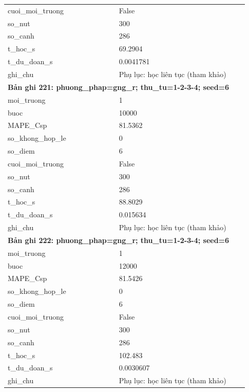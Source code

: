 \begin{longtable}{p{0.43\linewidth}p{0.50\linewidth}}
cuoi\_\allowbreak moi\_\allowbreak truong & False \\
so\_\allowbreak nut & 300 \\
so\_\allowbreak canh & 286 \\
t\_\allowbreak hoc\_\allowbreak s & 69.2904 \\
t\_\allowbreak du\_\allowbreak doan\_\allowbreak s & 0.0041781 \\
ghi\_\allowbreak chu & Phụ lục: học liên tục (tham khảo) \\
\midrule
\multicolumn{2}{p{0.95\linewidth}}{\textbf{Bản ghi 221: phuong\_phap=gng\_r; thu\_tu=1-2-3-4; seed=6}} \\
moi\_\allowbreak truong & 1 \\
buoc & 10000 \\
MAPE\_\allowbreak Csp & 81.5362 \\
so\_\allowbreak khong\_\allowbreak hop\_\allowbreak le & 0 \\
so\_\allowbreak diem & 6 \\
cuoi\_\allowbreak moi\_\allowbreak truong & False \\
so\_\allowbreak nut & 300 \\
so\_\allowbreak canh & 286 \\
t\_\allowbreak hoc\_\allowbreak s & 88.8029 \\
t\_\allowbreak du\_\allowbreak doan\_\allowbreak s & 0.015634 \\
ghi\_\allowbreak chu & Phụ lục: học liên tục (tham khảo) \\
\midrule
\multicolumn{2}{p{0.95\linewidth}}{\textbf{Bản ghi 222: phuong\_phap=gng\_r; thu\_tu=1-2-3-4; seed=6}} \\
moi\_\allowbreak truong & 1 \\
buoc & 12000 \\
MAPE\_\allowbreak Csp & 81.5426 \\
so\_\allowbreak khong\_\allowbreak hop\_\allowbreak le & 0 \\
so\_\allowbreak diem & 6 \\
cuoi\_\allowbreak moi\_\allowbreak truong & False \\
so\_\allowbreak nut & 300 \\
so\_\allowbreak canh & 286 \\
t\_\allowbreak hoc\_\allowbreak s & 102.483 \\
t\_\allowbreak du\_\allowbreak doan\_\allowbreak s & 0.0030607 \\
ghi\_\allowbreak chu & Phụ lục: học liên tục (tham khảo) \\

\end{longtable}
